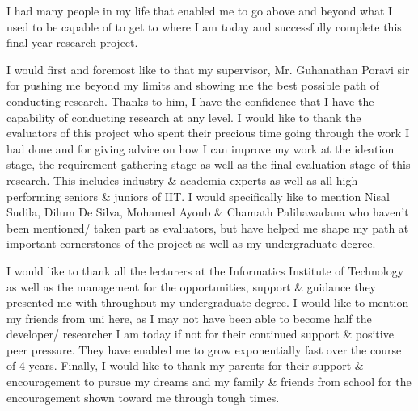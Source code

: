 I had many people in my life that enabled me to go above and beyond what I used to be capable of to get to where I am today and successfully complete this final year research project.

I would first and foremost like to that my supervisor, Mr. Guhanathan Poravi sir for pushing me beyond my limits and showing me the best possible path of conducting research. Thanks to him, I have the confidence that I have the capability of conducting research at any level. I would like to thank the evaluators of this project who spent their precious time going through the work I had done and for giving advice on how I can improve my work at the ideation stage, the requirement gathering stage as well as the final evaluation stage of this research. This includes industry \& academia experts as well as all high-performing seniors \& juniors of IIT. I would specifically like to mention Nisal Sudila, Dilum De Silva, Mohamed Ayoub \& Chamath Palihawadana who haven't been mentioned/ taken part as evaluators, but have helped me shape my path at important cornerstones of the project as well as my undergraduate degree.

I would like to thank all the lecturers at the Informatics Institute of Technology as well as the management for the opportunities, support \& guidance they presented me with throughout my undergraduate degree. I would like to mention my friends from uni here, as I may not have been able to become half the developer/ researcher I am today if not for their continued support \& positive peer pressure. They have enabled me to grow exponentially fast over the course of 4 years. Finally, I would like to thank my parents for their support \& encouragement to pursue my dreams and my family \& friends from school for the encouragement shown toward me through tough times.